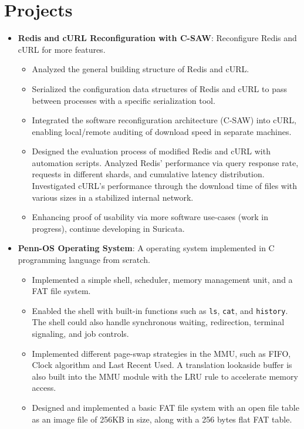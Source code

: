 \documentclass[a4paper]{article}
\newcommand{\resumeItem}[2]{
  \item\small{
    \textbf{#1}{: #2 \vspace{-2pt}}
  }
}
\newcommand{\resumeSubItem}[2]{\resumeItem{#1}{#2}\vspace{-3pt}}
\newcommand{\resumeSubHeadingListStart}{\begin{itemize}[leftmargin=*]}
\newcommand{\resumeSubHeadingListEnd}{\end{itemize}}
\begin{document}
\vspace{-5pt}
\section{Projects}
\resumeSubHeadingListStart
\resumeSubItem{Redis and cURL Reconfiguration with C-SAW}{Reconfigure Redis and
  cURL for more features.}
\begin{itemize}
  \item Analyzed the general building structure of Redis and cURL.
  \item Serialized the configuration data structures of Redis and cURL to pass
        between processes with a specific serialization tool.
  \item Integrated the software reconfiguration architecture (C-SAW) into cURL,
        enabling local/remote auditing of download speed in separate machines.
  \item Designed the evaluation process of modified Redis and cURL with
        automation scripts. Analyzed Redis' performance via query response rate,
        requests in different shards, and cumulative latency distribution.
        Investigated cURL's performance through the download time of files with
        various sizes in a stabilized internal network.
  \item Enhancing proof of usability via more software use-cases (work in
        progress), continue developing in Suricata.
\end{itemize}

\vspace{2pt}
\resumeSubItem{Penn-OS Operating System}
{A operating system implemented in C programming language from scratch.}
\begin{itemize}
  \item Implemented a simple shell, scheduler, memory management unit, and a FAT
        file system.
  \item Enabled the shell with built-in functions such as \texttt{ls},
        \texttt{cat}, and \texttt{history}. The shell could also handle
        synchronous waiting, redirection, terminal signaling, and job controls.
  \item Implemented different page-swap strategies in the MMU, such as FIFO,
        Clock algorithm and Last Recent Used. A translation lookaside buffer is
        also built into the MMU module with the LRU rule to accelerate memory
        access.
  \item Designed and implemented a basic FAT file system with an open file table
        as an image file of 256KB in size, along with a 256 bytes flat FAT
        table.
\end{itemize}
\resumeSubHeadingListEnd
\end{document}
